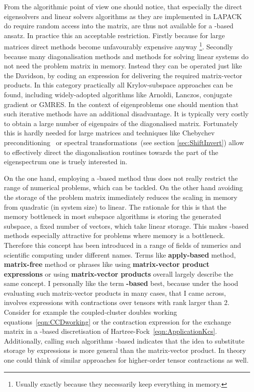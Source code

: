 From the algorithmic point of view one should notice,
that especially the direct eigensolvers and linear solvers algorithms
as they are implemented in LAPACK\cite{LAPACK}
do require random access into the matrix,
are thus not available for a \contraction-based ansatz.
In practice this an acceptable restriction.
Firstly because for large matrices direct methods become
unfavourably expensive anyway%
\footnote{Usually exactly because they necessarily keep everything in memory.}.
Secondly because many diagonalisation methods and methods for solving linear systems
do not need the problem matrix in memory.
Instead they can be operated just like the Davidson,
by coding an expression for delivering the required matrix-vector products.
In this category practically all Krylov-subspace approaches can be found,
including widely-adopted algorithms like
\noindent
Arnoldi, Lanczos, conjugate gradient or GMRES.
In the context of eigenproblems
one should mention that such iterative methods
have an additional disadvantage.
It is typically very costly to obtain a large number of eigenpairs
of the diagonalised matrix.
Fortunately this is hardly needed for large matrices
and techniques like Chebychev preconditioning~
or spectral transformations~(see section \vref{sec:ShiftInvert})
allow to effectively direct the diagonalisation routines
towards the part of the eigenspectrum one is truely interested in.

On the one hand, employing a \contraction-based method thus does not really
restrict the range of numerical problems, which can be tackled.
On the other hand avoiding the storage of the problem matrix
immediately reduces the scaling in memory from quadratic (in system size) to linear.
The rationale for this is that the memory bottleneck
in most subspace algorithms is storing the generated subspace,
\ie a fixed number of vectors, which take linear storage.
This makes \contraction-based methods especially
attractive for problems where memory is a bottleneck.
Therefore this concept has been
introduced in a range of fields of numerics and scientific computing
under different names.
Terms like \textbf{apply-based} method, \textbf{matrix-free} method
or phrases like using \textbf{matrix-vector product expressions}
or using \textbf{matrix-vector products}
overall largely describe the same concept.
I personally like the term \textbf{\contraction-based} best,
because under the hood
evaluating such matrix-vector products in many cases,
that I came across,
involves expressions with contractions over tensors with rank larger than 2.
Consider for example the coupled-cluster doubles working equations~\eqref{eqn:CCDworking}
or the contraction expression for the exchange matrix
in a \CS-based discretisation of Hartree-Fock~\eqref{eqn:ApplicationKcs}.
Additionally, calling such algorithms \contraction-based
indicates that the idea to substitute storage by expressions
is more general than the matrix-vector product.
In theory one could think of similar approaches for
higher-order tensor contractions as well.

